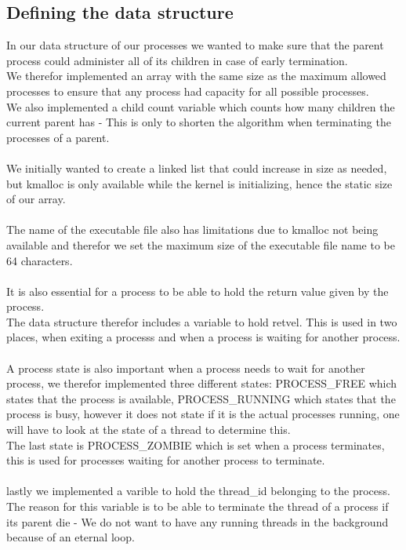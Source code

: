 \documentclass[a4paper,12pt,danish]{report}
\begin{document}
\subsection{Defining the data structure}
In our data structure of our processes we wanted to make sure that the parent process could administer all of its children in case of early termination.
\\
We therefor implemented an array with the same size as the maximum allowed processes to ensure that any process had capacity for all possible processes.
\\
We also implemented a child count variable which counts how many children the current parent has - This is only to shorten the algorithm when terminating the processes of a parent.
\\
\\
We initially wanted to create a linked list that could increase in size as needed, but kmalloc is only available while the kernel is initializing, hence the static size of our array.
\\
\\
The name of the executable file also has limitations due to kmalloc not being available and therefor we set the maximum size of the executable file name to be 64 characters.
\\
\\
It is also essential for a process to be able to hold the return value given by the process.
\\
The data structure therefor includes a variable to hold retvel. This is used in two places, when exiting a processs and when a process is waiting for another process.
\\
\\
A process state is also important when a process needs to wait for another process, we therefor implemented three different states: PROCESS\_FREE which states that the process is available, PROCESS\_RUNNING which states that the process is busy, however it does not state if it is the actual processes running, one will have to look at the state of a thread to determine this.
\\
The last state is PROCESS\_ZOMBIE which is set when a process terminates, this is used for processes waiting for another process to terminate.
\\
\\
lastly we implemented a varible to hold the thread\_id belonging to the process.
\\
The reason for this variable is to be able to terminate the thread of a process if its parent die - We do not want to have any running threads in the background because of an eternal loop.
\end{document}
